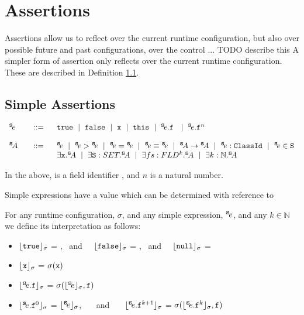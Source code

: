 \section{ Assertions}

Assertions allow us to reflect over the current runtime configuration, but also over possible future and past configurations, over 
the control ... TODO describe this
A simpler form of assertion only reflects over the current runtime configuration. These are described in Definition \ref{def:simple_assertion}.
 
 \subsection{Simple Assertions}
 \label{def:simple_assertion}
 \begin{definition} $ $ \\
 
 $\begin{array}{lcl}
 \SE & ::= &  \prg{true}  \ \mid\ \prg{false}  \ \mid \ \prg{x}  \ \mid\ \prg{this}  \ \mid \ \SE.\prg{f} \    \ \mid \ \SE.\prg{f}^n \  \\
 ~ \\
  \SA\ &\ \  ::=\ \  & \SE  \ \mid \ \SE > \SE \ \mid \  \SE=\SE  \ \mid \ \SE \equiv \SE \ \mid  \ \SA \rightarrow \SA \ \mid \   \SE:\prg{ClassId}  \ \mid \   
    \SE\in\prg{S}  \\
 & &   \exists \prg{x}.\SA  \ \mid \  \exists \prg{S}:SET.\SA  \ \mid \  \exists fs:FLD^k.\SA
 \ \mid \  \exists k:\mathbb{N}.\SA  
\end{array}$

\noindent
In the above,  is a field identifier , and  $n$ is a natural number.
\end{definition} 

Simple expressions have a value which can be determined with reference to 

\begin{definition}[Interpretations]

For any runtime configuration, $\sigma$, and any simple expression, ${^{\small{{\mbox{\tt{s}}}}}\!e}$, and any $k\in \mathbb{N}$ we define its interpretation as follows:

\begin{itemize}
     \item 
  $\interp {}{\sigma}$ = \prg{true}, \ and \ \    $\interp {}{\sigma}$ = \prg{false}, \ and \ \ 
   $\interp {}{\sigma}$ = \prg{null}
  \item
  ${\lfloor{ {{\mbox{\tt{x}}}}}\rfloor_{\sigma}}$ = $\sigma({\mbox{\tt{x}}})$
  \item
  ${\lfloor{ {\ensuremath{{^{\small{{\mbox{\tt{s}}}}}\!e}}.{\mbox{\tt{f}}}}}\rfloor_{\sigma}}$ = $\sigma({{\lfloor{ {\ensuremath{{^{\small{{\mbox{\tt{s}}}}}\!e}}}}\rfloor_{\sigma}}}, {\mbox{\tt{f}}})$
  \item
    ${\lfloor{ {\ensuremath{{^{\small{{\mbox{\tt{s}}}}}\!e}}.{\mbox{\tt{f}}}^0}}\rfloor_{\sigma}}$ =  ${\lfloor{ {\ensuremath{{^{\small{{\mbox{\tt{s}}}}}\!e}}}}\rfloor_{\sigma}}$, \ \ \ and \ \ \ ${\lfloor{ {\ensuremath{{^{\small{{\mbox{\tt{s}}}}}\!e}}.{\mbox{\tt{f}}}^{k+1}}}\rfloor_{\sigma}}$ =  $\sigma({{\lfloor{ {\ensuremath{{^{\small{{\mbox{\tt{s}}}}}\!e}}.{\mbox{\tt{f}}}^k}}\rfloor_{\sigma}}}, {\mbox{\tt{f}}})$
   \end{itemize}
\end{definition}

